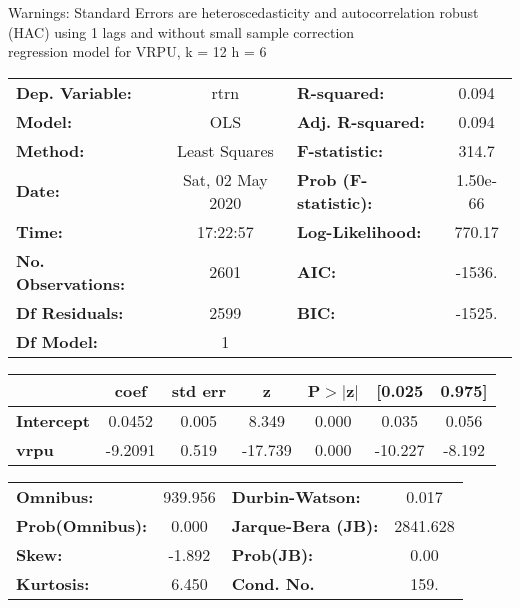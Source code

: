Warnings: \newline
 [1] Standard Errors are heteroscedasticity and autocorrelation robust (HAC) using 1 lags and without small sample correction\\ 

regression model for VRPU, k = 12 h = 6\begin{center}
\begin{tabular}{lclc}
\toprule
\textbf{Dep. Variable:}    &       rtrn       & \textbf{  R-squared:         } &     0.094   \\
\textbf{Model:}            &       OLS        & \textbf{  Adj. R-squared:    } &     0.094   \\
\textbf{Method:}           &  Least Squares   & \textbf{  F-statistic:       } &     314.7   \\
\textbf{Date:}             & Sat, 02 May 2020 & \textbf{  Prob (F-statistic):} &  1.50e-66   \\
\textbf{Time:}             &     17:22:57     & \textbf{  Log-Likelihood:    } &    770.17   \\
\textbf{No. Observations:} &        2601      & \textbf{  AIC:               } &    -1536.   \\
\textbf{Df Residuals:}     &        2599      & \textbf{  BIC:               } &    -1525.   \\
\textbf{Df Model:}         &           1      & \textbf{                     } &             \\
\bottomrule
\end{tabular}
\begin{tabular}{lcccccc}
                   & \textbf{coef} & \textbf{std err} & \textbf{z} & \textbf{P$> |$z$|$} & \textbf{[0.025} & \textbf{0.975]}  \\
\midrule
\textbf{Intercept} &       0.0452  &        0.005     &     8.349  &         0.000        &        0.035    &        0.056     \\
\textbf{vrpu}      &      -9.2091  &        0.519     &   -17.739  &         0.000        &      -10.227    &       -8.192     \\
\bottomrule
\end{tabular}
\begin{tabular}{lclc}
\textbf{Omnibus:}       & 939.956 & \textbf{  Durbin-Watson:     } &    0.017  \\
\textbf{Prob(Omnibus):} &   0.000 & \textbf{  Jarque-Bera (JB):  } & 2841.628  \\
\textbf{Skew:}          &  -1.892 & \textbf{  Prob(JB):          } &     0.00  \\
\textbf{Kurtosis:}      &   6.450 & \textbf{  Cond. No.          } &     159.  \\
\bottomrule
\end{tabular}
\end{center}

